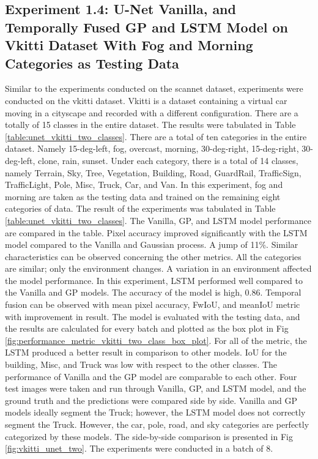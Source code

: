 	\newpage
	\newpage
	
	\subsection{Experiment 1.4: U-Net Vanilla, and Temporally Fused GP and LSTM Model on Vkitti Dataset With Fog and Morning Categories as Testing Data}
	    
	Similar to the experiments conducted on the scannet dataset, experiments were conducted on the vkitti dataset. Vkitti is a dataset containing a virtual car moving in a cityscape and recorded with a different configuration. There are a totally of 15 classes in the entire dataset. The results were tabulated in Table \ref{table:unet_vkitti_two_classes}. There are a total of ten categories in the entire dataset. Namely 15-deg-left, fog, overcast, morning, 30-deg-right, 15-deg-right, 30-deg-left, clone, rain, sunset. Under each category, there is a total of 14 classes, namely Terrain, Sky, Tree, Vegetation, Building, Road, GuardRail, TrafficSign, TrafficLight, Pole, Misc, Truck, Car, and Van. In this experiment, fog and morning are taken as the testing data and trained on the remaining eight categories of data.
	The result of the experiments was tabulated in Table \ref{table:unet_vkitti_two_classes}. The Vanilla, GP, and LSTM model performance are compared in the table. Pixel accuracy improved significantly with the LSTM model compared to the Vanilla and Gaussian process. A jump of 11\%. Similar characteristics can be observed concerning the other metrics. All the categories are similar; only the environment changes. A variation in an environment affected the model performance. In this experiment, LSTM performed well compared to the Vanilla and GP models. The accuracy of the model is high, 0.86. Temporal fusion can be observed with mean pixel accuracy, FwIoU, and meanIoU metric with improvement in result. The model is evaluated with the testing data, and the results are calculated for every batch and plotted as the box plot in Fig \ref{fig:performance_metric_vkitti_two_class_box_plot}. For all of the metric, the LSTM produced a better result in comparison to other models. IoU for the building, Misc, and Truck was low with respect to the other classes. The performance of Vanilla and the GP model are comparable to each other. Four test images were taken and run through Vanilla, GP, and LSTM model, and the ground truth and the predictions were compared side by side. Vanilla and GP models ideally segment the Truck; however, the LSTM model does not correctly segment the Truck. However, the car, pole, road, and sky categories are perfectly categorized by these models. The side-by-side comparison is presented in Fig \ref{fig:vkitti_unet_two}. The experiments were conducted in a batch of 8.
	
